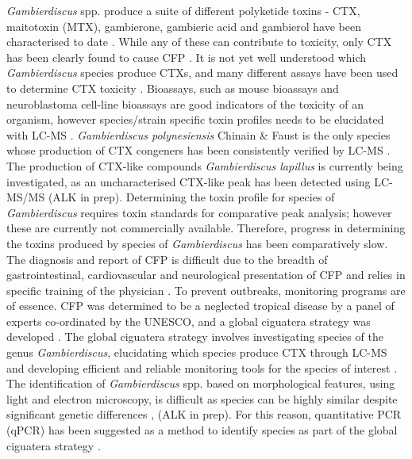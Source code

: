 \documentclass[12pt]{article}
\begin{document}
\emph{Gambierdiscus} spp. produce a suite of different polyketide toxins - CTX, maitotoxin (MTX), gambierone, gambieric acid and gambierol have been characterised to date \citep{satake1993gambierol,nagai1992gambieric,rodriguez2015gambierone,murata1993structure,murata1989structures}. While any of these can contribute to toxicity, only CTX has been clearly found to cause CFP \citep{chinain1997intraspecific,holmes1998gambierdiscus}. It is not yet well understood which \textit{Gambierdiscus} species produce CTXs, and many different assays have been used to determine CTX toxicity \citep{globalcig}. Bioassays, such as mouse bioassays and neuroblastoma cell-line bioassays are good indicators of the toxicity of an organism, however species/strain specific toxin profiles needs to be elucidated with LC-MS \citep{diogened2014chemistry}. \textit{Gambierdiscus polynesiensis} Chinain \& Faust is the only species whose production of CTX congeners has been consistently verified by LC-MS \citep{chinain2010growth}. The production of CTX-like compounds \emph{Gambierdiscus lapillus} is currently being investigated, as an uncharacterised CTX-like peak has been detected using LC-MS/MS (ALK in prep). Determining the toxin profile for species of \textit{Gambierdiscus} requires toxin standards for comparative peak analysis; however these are currently not commercially available. Therefore, progress in determining the toxins produced by species of \emph{Gambierdiscus} has been comparatively slow.\\

The diagnosis and report of CFP is difficult due to the breadth of gastrointestinal, cardiovascular and neurological presentation of CFP and relies in specific training of the physician \citep{sims1987theoretical}. 
To prevent outbreaks, monitoring programs are of essence. CFP was determined  to be  a neglected tropical disease by a panel of experts co-ordinated by the UNESCO, and a global ciguatera strategy was developed \cite{globalcig}. The global ciguatera strategy involves investigating species of the genus \emph{Gambierdiscus}, elucidating which species produce CTX through LC-MS and developing efficient and reliable monitoring tools for the species of interest \citep{globalcig}. The identification of \emph{Gambierdiscus} spp. based on morphological features, using light and electron microscopy, is difficult as species can be highly similar despite significant genetic differences \citep{kohli2014high,bravo2014cellular}, (ALK in prep). For this reason, quantitative PCR (qPCR) has been suggested as a method to identify species as part of the global ciguatera strategy \citep{globalcig}. \\
\end{document}
